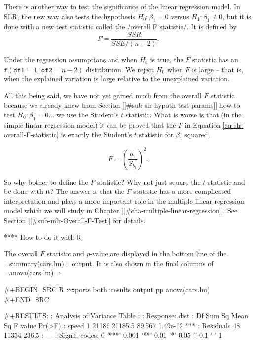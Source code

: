 There is another way to test the significance of the linear regression
model. In SLR, the new way also tests the hypothesis
\(H_{0}:\beta_{1}=0\) versus \(H_{1}:\beta_{1}\neq0\), but it is done
with a new test statistic called the /overall F statistic/. It is
defined by
\begin{equation}
\label{eq-slr-overall-F-statistic}
F=\frac{SSR}{SSE/(n-2)}.
\end{equation}

Under the regression assumptions and when \(H_{0}\) is true, the \(F\)
statistic has an \(\mathtt{f}(\mathtt{df1}=1,\,\mathtt{df2}=n-2)\)
distribution. We reject \(H_{0}\) when \(F\) is large -- that is, when
the explained variation is large relative to the unexplained
variation.

All this being said, we have not yet gained much from the overall
\(F\) statistic because we already knew from Section
[[#sub-slr-hypoth-test-params]] how to test \(H_{0}:\beta_{1} =
0\)... we use the Student's \(t\) statistic. What is worse is that (in
the simple linear regression model) it can be proved that the \(F\) in
Equation \eqref{eq-slr-overall-F-statistic} is exactly the Student's
\(t\) statistic for \(\beta_{1}\) squared,

\begin{equation}
F=\left(\frac{b_{1}}{S_{b_{1}}}\right)^{2}.
\end{equation}

So why bother to define the \(F\) statistic? Why not just square the
\(t\) statistic and be done with it? The answer is that the \(F\)
statistic has a more complicated interpretation and plays a more
important role in the multiple linear regression model which we will
study in Chapter [[#cha-multiple-linear-regression]]. See Section
[[#sub-mlr-Overall-F-Test]] for details.

**** How to do it with \(\mathsf{R}\)

The overall \(F\) statistic and \(p\)-value are displayed in the
bottom line of the =summary(cars.lm)= output. It is also shown in the
final columns of =anova(cars.lm)=:

#+BEGIN_SRC R :exports both :results output pp 
anova(cars.lm)
#+END_SRC

#+RESULTS:
: Analysis of Variance Table
: 
: Response: dist
:           Df Sum Sq Mean Sq F value   Pr(>F)    
: speed      1  21186 21185.5  89.567 1.49e-12 ***
: Residuals 48  11354   236.5                     
: ---
: Signif. codes:  0 '***' 0.001 '**' 0.01 '*' 0.05 '.' 0.1 ' ' 1

